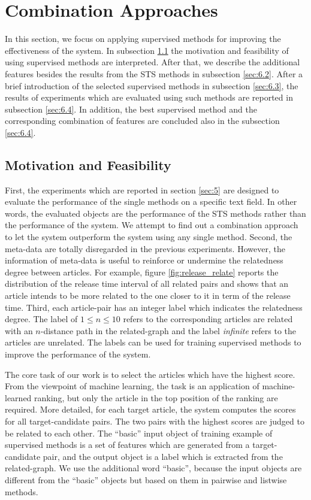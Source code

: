 \section{Combination Approaches}
\label{sec:6}

In this section, we focus on applying supervised methods for improving the effectiveness of the system. In subsection \ref{sec:6.1} the motivation and feasibility of using supervised methods are interpreted. After that, we describe the additional features besides the results from the STS methods in subsection \ref{sec:6.2}. After a brief introduction of the selected supervised methods in subsection \ref{sec:6.3}, the results of experiments which are evaluated using such methods are reported in subsection \ref{sec:6.4}. In addition, the best supervised method and the corresponding combination of features are concluded also in the subsection \ref{sec:6.4}.


\subsection{Motivation and Feasibility}
\label{sec:6.1}

First, the experiments which are reported in section \ref{sec:5} are designed to evaluate the performance of the single methods on a specific text field. In other words, the evaluated objects are the performance of the STS methods rather than the performance of the system. We attempt to find out a combination approach to let the system outperform the system using any single method. Second, the meta-data are totally disregarded in the previous experiments. However, the information of meta-data is useful to reinforce or undermine the relatedness degree between articles. For example, figure \ref{fig:release_relate} reports the distribution of the release time interval of all related pairs and shows that an article intends to be more related to the one closer to it in term of the release time. Third, each article-pair has an integer label which indicates the relatedness degree. The label of $1 \le n \le 10$ refers to the corresponding articles are related with an $n$-distance path in the related-graph and the label \textit{infinite} refers to the articles are unrelated. The labels can be used for training supervised methods to improve the performance of the system. 

The core task of our work is to select the articles which have the highest score. From the viewpoint of machine learning, the task is an application of machine-learned ranking, but only the article in the top position of the ranking are required. More detailed, for each target article, the system computes the scores for all target-candidate pairs. The two pairs with the highest scores are judged to be related to each other. The ``basic'' input object of training example of supervised methods is a set of features which are generated from a target-candidate pair, and the output object is a label which is extracted from the related-graph. We use the additional word ``basic'', because the input objects are different from the ``basic'' objects but based on them in pairwise and listwise methods. 

